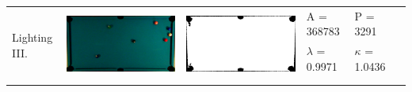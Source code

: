 \begin{table}
\begin{tabular}{|l|c|c|l|l|c|}
\multirow{4}{*}{Lighting III.} & \multirow{4}{*}{\includegraphics[scale=0.08]{../images/1/14_img.png}} & \multirow{4}{*}{\includegraphics[scale=0.08]{../images/1/14_mask.png}} & A = 368783 & P = 3291 & \multirow{4}{*}{}\\ 
& & & $\lambda$ = 0.9971 & $\kappa$ = 1.0436 & \\
&&&&&\\
&&&&&\\
\hline


\end{tabular}
\end{table}
